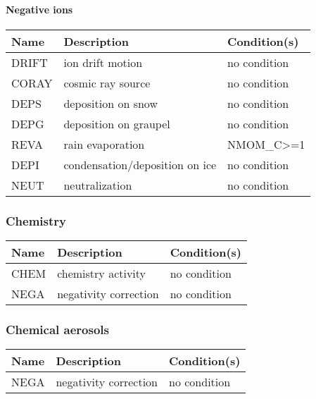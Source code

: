 \paragraph{Negative ions}
\mbox{} %

\begin{longtable} {|p{}|p{}|p{}|}
\hline
Name & Description & Condition(s) \\
\hline \hline
\endhead
DRIFT  & ion drift motion               & no condition \\\hline
CORAY  & cosmic ray source              & no condition \\\hline
DEPS   & deposition on snow             & no condition \\\hline
DEPG   & deposition on graupel          & no condition \\\hline
REVA   & rain evaporation               & NMOM\_C>=1      \\\hline
DEPI   & condensation/deposition on ice & no condition \\\hline
NEUT   & neutralization                 & no condition \\\hline
\end{longtable}


\subsubsection{Chemistry}

\begin{longtable} {|p{}|p{}|p{}|}
\hline
Name & Description & Condition(s) \\
\hline \hline
\endhead
CHEM   & chemistry activity    & no condition \\\hline
NEGA   & negativity correction & no condition \\\hline
\end{longtable}


\subsubsection{Chemical aerosols}

\begin{longtable} {|p{}|p{}|p{}|}
\hline
Name & Description & Condition(s) \\
\hline \hline
\endhead
NEGA   & negativity correction & no condition \\\hline
\end{longtable}


